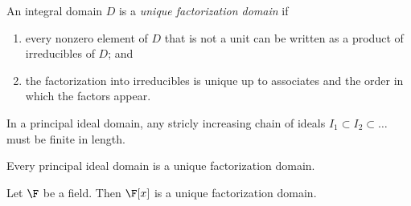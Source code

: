
\begin{definition}
	An integral domain $D$ is a \textit{unique factorization domain} if
	\begin{enumerate}
		\item every nonzero element of $D$ that is not a unit can be written as a product of irreducibles of $D$; and
		\item the factorization into irreducibles is unique up to associates and the order in which the factors appear.
	\end{enumerate}
\end{definition}

\begin{lemma}
	In a principal ideal domain, any stricly increasing chain of ideals $I_1 \subset I_2 \subset \dots$ must be finite in length.
\end{lemma}

\begin{theorem}
	Every principal ideal domain is a unique factorization domain.
\end{theorem}

\begin{corollary}
	Let $\F$ be a field. Then $\F[x]$ is a unique factorization domain.
\end{corollary}
